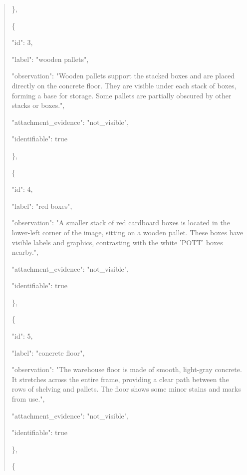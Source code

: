 \documentclass[10pt,a4paper]{article}
\begin{document}
\begin{quote}
    \},\allowbreak{}\par
    \{\par
      "id":\allowbreak{} 3,\allowbreak{}\par
      "label":\allowbreak{} "wooden pallets",\allowbreak{}\par
      "observation":\allowbreak{} "Wooden pallets support the stacked boxes and are placed directly on the concrete floor. They are visible under each stack of boxes,\allowbreak{} forming a base for storage. Some pallets are partially obscured by other stacks or boxes.",\allowbreak{}\par
      "attachment\_evidence":\allowbreak{} "not\_visible",\allowbreak{}\par
      "identifiable":\allowbreak{} true\par
    \},\allowbreak{}\par
    \{\par
      "id":\allowbreak{} 4,\allowbreak{}\par
      "label":\allowbreak{} "red boxes",\allowbreak{}\par
      "observation":\allowbreak{} "A smaller stack of red cardboard boxes is located in the lower-left corner of the image,\allowbreak{} sitting on a wooden pallet. These boxes have visible labels and graphics,\allowbreak{} contrasting with the white 'POTT' boxes nearby.",\allowbreak{}\par
      "attachment\_evidence":\allowbreak{} "not\_visible",\allowbreak{}\par
      "identifiable":\allowbreak{} true\par
    \},\allowbreak{}\par
    \{\par
      "id":\allowbreak{} 5,\allowbreak{}\par
      "label":\allowbreak{} "concrete floor",\allowbreak{}\par
      "observation":\allowbreak{} "The warehouse floor is made of smooth,\allowbreak{} light-gray concrete. It stretches across the entire frame,\allowbreak{} providing a clear path between the rows of shelving and pallets. The floor shows some minor stains and marks from use.",\allowbreak{}\par
      "attachment\_evidence":\allowbreak{} "not\_visible",\allowbreak{}\par
      "identifiable":\allowbreak{} true\par
    \},\allowbreak{}\par
    \{\par

\end{quote}
\end{document}

